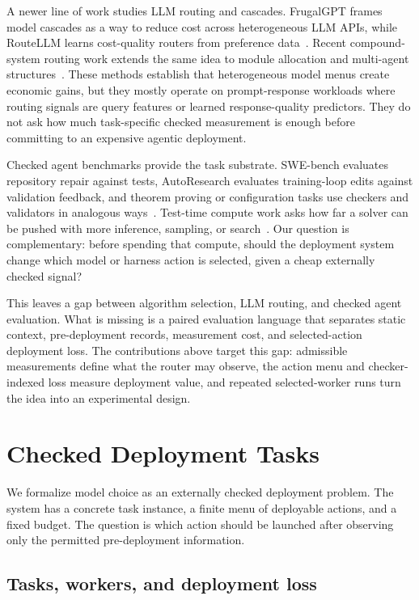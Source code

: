 \documentclass{article}
\begin{document}
A newer line of work studies LLM routing and cascades.
FrugalGPT frames model cascades as a way to reduce cost across heterogeneous LLM APIs, while RouteLLM learns cost-quality routers from preference data~\citep{chen2023frugalgpt, ong2024routellm}.
Recent compound-system routing work extends the same idea to module allocation and multi-agent structures~\citep{chen2025optimizing, yue2025masrouter}.
These methods establish that heterogeneous model menus create economic gains, but they mostly operate on prompt-response workloads where routing signals are query features or learned response-quality predictors.
They do not ask how much task-specific checked measurement is enough before committing to an expensive agentic deployment.

Checked agent benchmarks provide the task substrate.
SWE-bench evaluates repository repair against tests, AutoResearch evaluates training-loop edits against validation feedback, and theorem proving or configuration tasks use checkers and validators in analogous ways~\citep{jimenez2024swebench, karpathy2026autoresearch}.
Test-time compute work asks how far a solver can be pushed with more inference, sampling, or search~\citep{snell2025testtime, brown2024monkeys, wu2025inference}.
Our question is complementary: before spending that compute, should the deployment system change which model or harness action is selected, given a cheap externally checked signal?

This leaves a gap between algorithm selection, LLM routing, and checked agent evaluation.
What is missing is a paired evaluation language that separates static context, pre-deployment records, measurement cost, and selected-action deployment loss.
The contributions above target this gap: admissible measurements define what the router may observe, the action menu and checker-indexed loss measure deployment value, and repeated selected-worker runs turn the idea into an experimental design.


\section{Checked Deployment Tasks}
\label{sec:setup}

We formalize model choice as an externally checked deployment problem.
The system has a concrete task instance, a finite menu of deployable actions, and a fixed budget.
The question is which action should be launched after observing only the permitted pre-deployment information.

\subsection{Tasks, workers, and deployment loss}
\end{document}
